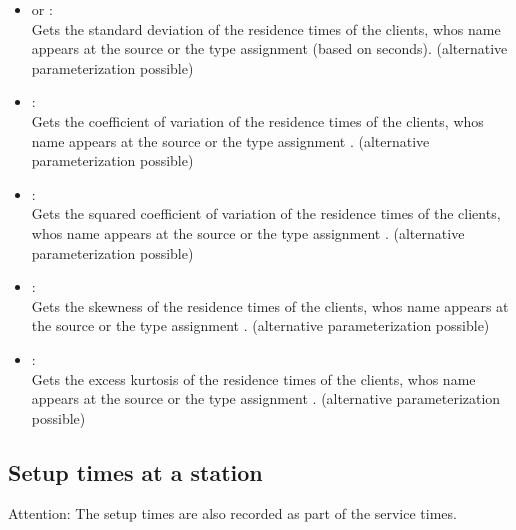 \begin{itemize}
\item
{} or :\\
Gets the standard deviation of the residence times of the clients, whos name appears at the source or the type assignment  (based on seconds).
(alternative parameterization possible)

\item
{}:\\
Gets the coefficient of variation of the residence times of the clients, whos name appears at the source or the type assignment .
(alternative parameterization possible)

\item
{}:\\
Gets the squared coefficient of variation of the residence times of the clients, whos name appears at the source or the type assignment .
(alternative parameterization possible)

\item
{}:\\
Gets the skewness of the residence times of the clients, whos name appears at the source or the type assignment .
(alternative parameterization possible)

\item
{}:\\
Gets the excess kurtosis of the residence times of the clients, whos name appears at the source or the type assignment .
(alternative parameterization possible)

\end{itemize}



\subsection{Setup times at a station}

Attention: The setup times are also recorded as part of the service times.

